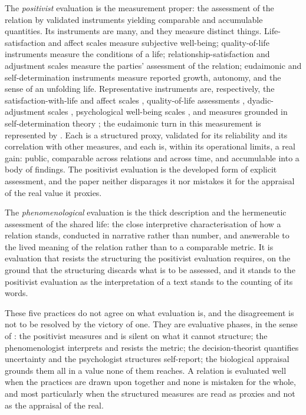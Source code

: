 The \emph{positivist} evaluation is the measurement proper: the assessment of the relation by validated instruments yielding comparable and accumulable quantities. Its instruments are many, and they measure distinct things. Life-satisfaction and affect scales measure subjective well-being; quality-of-life instruments measure the conditions of a life; relationship-satisfaction and adjustment scales measure the parties' assessment of the relation; eudaimonic and self-determination instruments measure reported growth, autonomy, and the sense of an unfolding life. Representative instruments are, respectively, the satisfaction-with-life and affect scales \parencite{diener1985,watson1988}, quality-of-life assessments \parencite{whoqol1998}, dyadic-adjustment scales \parencite{spanier1976}, psychological well-being scales \parencite{ryff1989}, and measures grounded in self-determination theory \parencite{ryan2000,deci1985sdt}; the eudaimonic turn in this measurement is represented by \textcite{seligman2011}. Each is a structured proxy, validated for its reliability and its correlation with other measures, and each is, within its operational limits, a real gain: public, comparable across relations and across time, and accumulable into a body of findings. The positivist evaluation is the developed form of explicit assessment, and the paper neither disparages it nor mistakes it for the appraisal of the real value it proxies.

The \emph{phenomenological} evaluation is the thick description and the hermeneutic assessment of the shared life: the close interpretive characterisation of how a relation stands, conducted in narrative rather than number, and answerable to the lived meaning of the relation rather than to a comparable metric. It is evaluation that resists the structuring the positivist evaluation requires, on the ground that the structuring discards what is to be assessed, and it stands to the positivist evaluation as the interpretation of a text stands to the counting of its words.

These five practices do not agree on what evaluation is, and the disagreement is not to be resolved by the victory of one. They are evaluative phases, in the sense of : the positivist measures and is silent on what it cannot structure; the phenomenologist interprets and resists the metric; the decision-theorist quantifies uncertainty and the psychologist structures self-report; the biological appraisal grounds them all in a value none of them reaches. A relation is evaluated well when the practices are drawn upon together and none is mistaken for the whole, and most particularly when the structured measures are read as proxies and not as the appraisal of the real.

